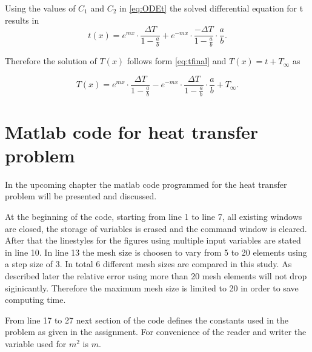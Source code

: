 Using the values of $C_1$ and $C_2$ in \autoref{eq:ODEt} the solved differential equation for t results in
\begin{equation}
\label{eq:tfinal}
t(x) = e^{mx} \cdot \frac{\Delta T}{1 - \frac{a}{b}} + e^{-mx} \cdot \frac{-\Delta T}{1 - \frac{a}{b}} \cdot \frac{a}{b}.
\end{equation}

Therefore the solution of $T(x)$ follows form \autoref{eq:tfinal} and $T(x) = t + T_{\infty}$ as 

\begin{equation}
T(x) = e^{mx} \cdot \frac{\Delta T}{1 - \frac{a}{b}} - e^{-mx} \cdot \frac{\Delta T}{1 - \frac{a}{b}} \cdot \frac{a}{b} + T_\infty.
\end{equation}


\chapter{Matlab code for heat transfer problem}
\label{ch:matlabcode}

In the upcoming chapter the matlab code programmed for the heat transfer problem will be presented and discussed. 






At the beginning of the code, starting from line 1 to line 7, all existing windows are closed, the storage of variables is erased and the command window is cleared. 
After that the linestyles for the figures using multiple input variables are stated in line 10. 
In line 13 the mesh size is choosen to vary from 5 to 20 elements using a step size of 3. In total 6 different mesh sizes are compared in this study. As described later the relative error using more than 20 mesh elements will not drop siginicantly. Therefore the maximum mesh size is limited to 20 in order to save computing time. 

From line 17 to 27 next section of the code defines the constants used in the problem as given in the assignment. For convenience of the reader and writer the variable used for $m^2$ is $m$.  

